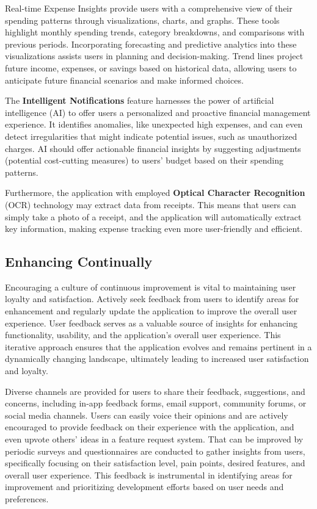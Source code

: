 Real-time Expense Insights provide users with a comprehensive view of their spending patterns through visualizations, 
charts, and graphs. These tools highlight monthly spending trends, category breakdowns, and comparisons with previous 
periods. Incorporating forecasting and predictive analytics into these visualizations assists users in planning and 
decision-making. Trend lines project future income, expenses, or savings based on historical data, allowing users to 
anticipate future financial scenarios and make informed choices.

The \textbf{Intelligent Notifications} feature harnesses the power of artificial intelligence (AI) to offer users a 
personalized and proactive financial management experience. It identifies anomalies, like unexpected high expenses, 
and can even detect irregularities that might indicate potential issues, such as unauthorized charges. AI should offer 
actionable financial insights by suggesting adjustments (potential cost-cutting measures) to users' budget based on 
their spending patterns.


Furthermore, the application with employed \textbf{Optical Character Recognition} (OCR) technology may extract data 
from receipts. This means that users can simply take a photo of a receipt, and the application will automatically 
extract key information, making expense tracking even more user-friendly and efficient.


\subsection{Enhancing Continually}

Encouraging a culture of continuous improvement is vital to maintaining user loyalty and satisfaction. Actively seek 
feedback from users to identify areas for enhancement and regularly update the application to improve the overall user 
experience. User feedback serves as a valuable source of insights for enhancing functionality, usability, and the 
application's overall user experience. This iterative approach ensures that the application evolves and remains 
pertinent in a dynamically changing landscape, ultimately leading to increased user satisfaction and loyalty.

Diverse channels are provided for users to share their feedback, suggestions, and concerns, including in-app feedback 
forms, email support, community forums, or social media channels. Users can easily voice their opinions and are 
actively encouraged to provide feedback on their experience with the application, and even upvote others' ideas in a 
feature request system. That can be improved by periodic surveys and questionnaires are conducted to gather insights 
from users, specifically focusing on their satisfaction level, pain points, desired features, and overall user 
experience. This feedback is instrumental in identifying areas for improvement and prioritizing development efforts 
based on user needs and preferences.

